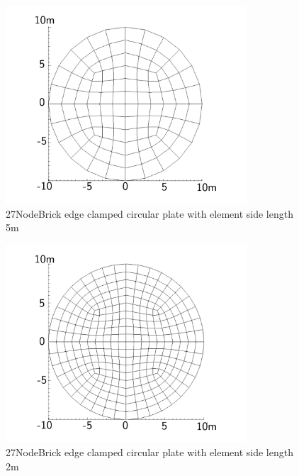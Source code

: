 \documentclass[fleqn,11pt]{article}
\begin{document}
\newpage

\begin{figure}[H]
  \centering
  \includegraphics[width=9cm]{../Figure-files/circular_plate2.pdf}
  \caption{27NodeBrick edge clamped circular plate with element side length 5m }
  \label{fig 27NodeBrick edges clamped circular plate with element side length 5m }
\end{figure}


\begin{figure}[H]
  \centering
  \includegraphics[width=9cm]{../Figure-files/circular_plate3.pdf}
  \caption{27NodeBrick edge clamped circular plate with element side length 2m }
  \label{fig 27NodeBrick edges clamped circular plate with element side length 2m }
\end{figure}

\newpage
\end{document}
